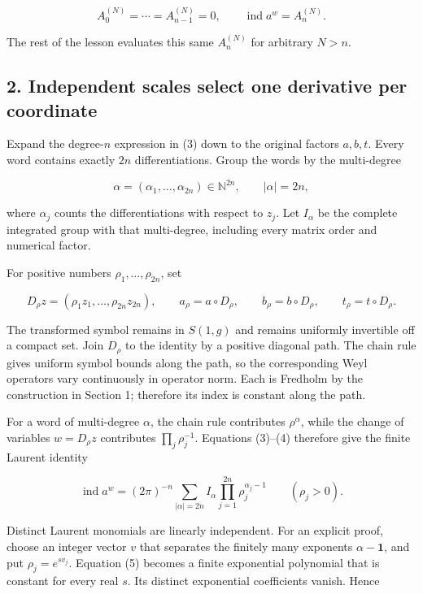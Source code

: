 \documentclass[
  11pt,
]{article}
\begin{document}
\[
 A_0^{(N)}=\cdots=A_{n-1}^{(N)}=0,
 \qquad
 \operatorname{ind}a^w=A_n^{(N)}.
 \tag{4}
\]

The rest of the lesson evaluates this same \(A_n^{(N)}\) for arbitrary
\(N>n\).

\subsection{2. Independent scales select one derivative per
coordinate}\label{independent-scales-select-one-derivative-per-coordinate}

Expand the degree-\(n\) expression in (3) down to the original factors
\(a,b,t\). Every word contains exactly \(2n\) differentiations. Group
the words by the multi-degree

\[
 \alpha=(\alpha_1,\ldots,\alpha_{2n})\in\mathbb N^{2n},
 \qquad |\alpha|=2n,
\]

where \(\alpha_j\) counts the differentiations with respect to \(z_j\).
Let \(I_\alpha\) be the complete integrated group with that
multi-degree, including every matrix order and numerical factor.

For positive numbers \(\rho_1,\ldots,\rho_{2n}\), set

\[
 D_\rho z=(\rho_1z_1,\ldots,\rho_{2n}z_{2n}),
 \qquad
 a_\rho=a\circ D_\rho,\qquad
 b_\rho=b\circ D_\rho,\qquad
 t_\rho=t\circ D_\rho.
\]

The transformed symbol remains in \(S(1,g)\) and remains uniformly
invertible off a compact set. Join \(D_\rho\) to the identity by a
positive diagonal path. The chain rule gives uniform symbol bounds along
the path, so the corresponding Weyl operators vary continuously in
operator norm. Each is Fredholm by the construction in Section 1;
therefore its index is constant along the path.

For a word of multi-degree \(\alpha\), the chain rule contributes
\(\rho^\alpha\), while the change of variables \(w=D_\rho z\)
contributes \(\prod_j\rho_j^{-1}\). Equations (3)--(4) therefore give
the finite Laurent identity

\[
 \operatorname{ind}a^w
  =(2\pi)^{-n}\sum_{|\alpha|=2n}
       I_\alpha\prod_{j=1}^{2n}\rho_j^{\alpha_j-1}
       \qquad(\rho_j>0).
 \tag{5}
\]

Distinct Laurent monomials are linearly independent. For an explicit
proof, choose an integer vector \(v\) that separates the finitely many
exponents \(\alpha-\mathbf1\), and put \(\rho_j=e^{s v_j}\). Equation
(5) becomes a finite exponential polynomial that is constant for every
real \(s\). Its distinct exponential coefficients vanish. Hence
\end{document}
